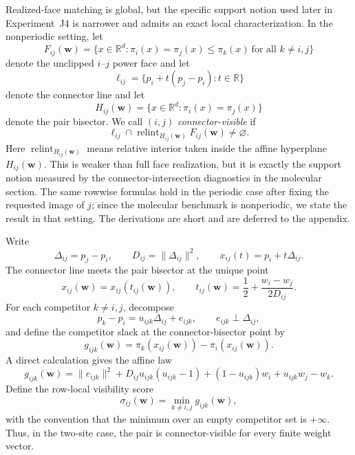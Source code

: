 \documentclass[preprint,12pt]{elsarticle}
\newcommand{\R}{\mathbb{R}}
\newcommand{\weights}{\mathbf{w}}
\newcommand{\relint}{\operatorname{relint}}
\begin{document}
Realized-face matching is global, but the specific support notion used later in
Experiment~J4 is narrower and admits an exact local characterization. In the
nonperiodic setting, let
\begin{equation}
    F_{ij}(\weights)=\{x\in\R^d : \pi_i(x)=\pi_j(x)\le \pi_k(x)\ \text{for all } k\neq i,j\}
\end{equation}
denote the unclipped $i$--$j$ power face and let
\begin{equation}
    \ell_{ij}=\{p_i+t(p_j-p_i): t\in\R\}
\end{equation}
denote the connector line and let
\begin{equation}
    H_{ij}(\weights)=\{x\in\R^d : \pi_i(x)=\pi_j(x)\}
\end{equation}
denote the pair bisector. We call $(i,j)$ \emph{connector-visible} if
\begin{equation}
    \ell_{ij}\cap \relint_{H_{ij}(\weights)} F_{ij}(\weights)\neq\varnothing.
\end{equation}
Here $\relint_{H_{ij}(\weights)}$ means relative interior taken
inside the affine hyperplane $H_{ij}(\weights)$. This is weaker than full
face realization, but it is exactly the support notion
measured by the connector-intersection diagnostics in the molecular section.
The same rowwise formulas hold in the periodic case after fixing the requested
image of $j$; since the molecular benchmark is nonperiodic, we state the result
in that setting. The derivations are short and are deferred to the appendix.

Write
\begin{equation}
    \Delta_{ij}=p_j-p_i,\qquad
    D_{ij}=\lVert \Delta_{ij}\rVert^2,\qquad
    x_{ij}(t)=p_i+t\Delta_{ij}.
\end{equation}
The connector line meets the pair bisector at the unique point
\begin{equation}
    x_{ij}(\weights)=x_{ij}(t_{ij}(\weights)),\qquad
    t_{ij}(\weights)=\frac12+\frac{w_i-w_j}{2D_{ij}}.
\end{equation}
For each competitor $k\neq i,j$, decompose
\begin{equation}
    p_k-p_i=u_{ijk}\Delta_{ij}+e_{ijk},\qquad e_{ijk}\perp \Delta_{ij},
\end{equation}
and define the competitor slack at the connector-bisector point by
\begin{equation}
    g_{ijk}(\weights)=\pi_k(x_{ij}(\weights))-\pi_i(x_{ij}(\weights)).
\end{equation}
A direct calculation gives the affine law
\begin{equation}
    g_{ijk}(\weights)=\lVert e_{ijk}\rVert^2+D_{ij}u_{ijk}(u_{ijk}-1)
    +(1-u_{ijk})w_i+u_{ijk}w_j-w_k.
\end{equation}
Define the row-local visibility score
\begin{equation}
    \sigma_{ij}(\weights)=\min_{k\neq i,j} g_{ijk}(\weights),
\end{equation}
with the convention that the minimum over an empty competitor set is $+\infty$.
Thus, in the two-site case, the pair is connector-visible for every finite
weight vector.
\end{document}
